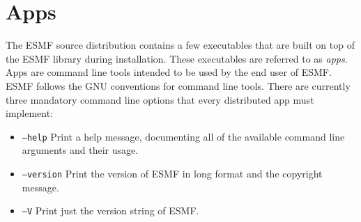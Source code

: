 
\section{Apps}
\label{sec:Apps}

The ESMF source distribution contains a few executables that are built on top
of the ESMF library during installation. These executables are referred to as
{\em apps}. Apps are command line tools intended to be used by the end user of
ESMF. ESMF follows the GNU conventions for command line tools. There are 
currently three mandatory command line options that every distributed app must
implement:

\begin{itemize}
\item {\tt --help} Print a help message, documenting all of the available 
command line arguments and their usage.
\item {\tt --version} Print the version of ESMF in long format and the 
copyright message.
\item {\tt --V} Print just the version string of ESMF.
\end{itemize}
